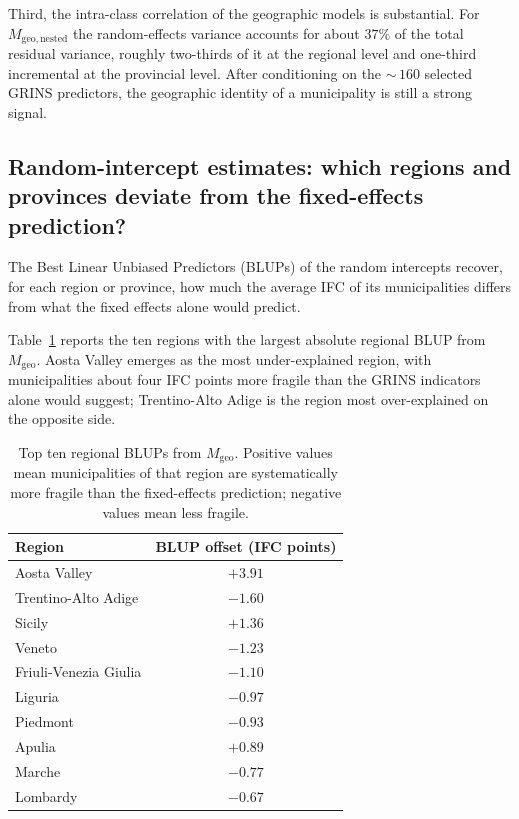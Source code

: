 \documentclass[11pt,a4paper]{article}
\begin{document}
Third, the intra-class correlation of the geographic models is
substantial. For \(M_{\mathrm{geo,nested}}\) the random-effects
variance accounts for about \(37\%\) of the total residual variance,
roughly two-thirds of it at the regional level and one-third
incremental at the provincial level. After conditioning on the
\(\sim\,160\) selected GRINS predictors, the geographic identity of a
municipality is still a strong signal.

\subsection{Random-intercept estimates: which regions and provinces deviate from the fixed-effects prediction?}

The Best Linear Unbiased Predictors (BLUPs) of the random intercepts
recover, for each region or province, how much the average IFC of its
municipalities differs from what the fixed effects alone would predict.

Table~\ref{tab:ranef_region} reports the ten regions with the largest
absolute regional BLUP from \(M_{\mathrm{geo}}\). Aosta Valley
emerges as the most under-explained region, with municipalities about
four IFC points more fragile than the GRINS indicators alone would
suggest; Trentino-Alto Adige is the region most over-explained on the
opposite side.

\begin{table}[h!]
  \centering
  \begin{tabular}{lc}
    \toprule
    Region & BLUP offset (IFC points) \\
    \midrule
    Aosta Valley           & \(+3.91\) \\
    Trentino-Alto Adige    & \(-1.60\) \\
    Sicily                 & \(+1.36\) \\
    Veneto                 & \(-1.23\) \\
    Friuli-Venezia Giulia  & \(-1.10\) \\
    Liguria                & \(-0.97\) \\
    Piedmont               & \(-0.93\) \\
    Apulia                 & \(+0.89\) \\
    Marche                 & \(-0.77\) \\
    Lombardy               & \(-0.67\) \\
    \bottomrule
  \end{tabular}
  \caption{Top ten regional BLUPs from \(M_{\mathrm{geo}}\). Positive
    values mean municipalities of that region are systematically more
    fragile than the fixed-effects prediction; negative values mean
    less fragile.}
  \label{tab:ranef_region}
\end{table}
\end{document}
